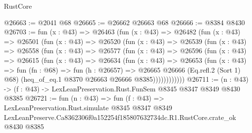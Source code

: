 \begin{lexlean}{RustCore}
\begin{coremodule}
@26663 := @2041 @68
@26665 := @26662 @26663 @68
@26666 := @8384 @8430
@26703 := fun (x : @43) =>
  @26463
    (fun (x : @43) =>
    @26482
      (fun (x : @43) =>
      @26501
        (fun (x : @43) =>
        @26520
          (fun (x : @43) =>
          @26539
            (fun (x : @43) =>
            @26558
              (fun (x : @43) =>
              @26577
                (fun (x : @43) =>
                @26596
                  (fun (x : @43) =>
                  @26615
                    (fun (x : @43) =>
                    @26634
                      (fun (x : @43) =>
                      @26653
                        (fun (x : @43) =>
                        fun (fn : @68) =>
                        fun (h : @26657) =>
                        @26665
                          @26666
                          (Eq.refl.{2} (Sort 1) @68)
                          (heq_of_eq.{1} @8370 @26663 @26666 @8385))))))))))))
@26711 := (n : @43) -> (f : @43) -> LexLeanPreservation.Rust.FunSem @8345 @8347 @8349 @8430 @8385
@26721 := fun (n : @43) =>
  fun (f : @43) =>
  LexLeanPreservation.Rust.simulate
    @8345
    @8347
    @8349
    LexLeanPreserve.Ca8362306f0a152254f185807632734dc.R1.RustCore.crate_ok
    @8430
    @8385
\end{coremodule}
\end{lexlean}
